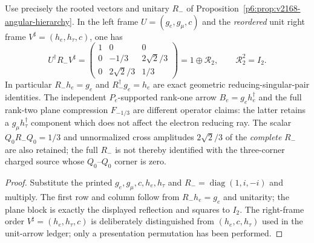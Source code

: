 \documentclass[12pt,a4paper]{article}
\begin{document}
\begin{proposition}
\label{p6:prop:v239-rooted-hopf-one-plus-two}
Use precisely the rooted vectors and unitary $R_-$ of
Proposition~\ref{p6:prop:v2168-angular-hierarchy}. In the left frame
$U=(g_e,g_\mu,c)$ and the \emph{reordered} unit right frame
$V^\sharp=(h_e,h_\tau,c)$, one has
\begin{equation}\label{p6:eq:v239-hopf-normal-form}
 \boxed{U^\dagger R_-V^\sharp=
 \begin{pmatrix}
 1&0&0\\
 0&-1/3&2\sqrt2/3\\
 0&2\sqrt2/3&1/3
 \end{pmatrix}=1\oplus\mathcal R_2,\qquad \mathcal R_2^2=I_2.}
\end{equation}
In particular $R_-h_e=g_e$ and $R_-^\dagger g_e=h_e$ are exact
geometric reducing-singular-pair identities. The independent
$P_e$-supported rank-one arrow $B_e=g_eh_e^\dagger$ and the full
rank-two plane compression $F_{-1/3}$ are different operator claims:
the latter retains a $g_\mu h_\tau^\dagger$ component which does not
affect the electron reducing ray. The scalar $Q_0R_-Q_0=1/3$
and unnormalized cross amplitudes $2\sqrt2/3$ of the \emph{complete}
$R_-$ are also retained; the full $R_-$ is not thereby identified
with the three-corner charged source whose $Q_0$--$Q_0$ corner is zero.
\end{proposition}
\begin{proof}
Substitute the printed $g_e,g_\mu,c,h_e,h_\tau$ and
$R_-=\operatorname{diag}(1,i,-i)$ and multiply. The first row and
column follow from $R_-h_e=g_e$ and unitarity; the plane block is
exactly the displayed reflection and squares to $I_2$.
The right-frame order $V^\sharp=(h_e,h_\tau,c)$ is deliberately
distinguished from $(h_e,c,h_\tau)$ used in the unit-arrow ledger;
only a presentation permutation has been performed.
\end{proof}
\end{document}
